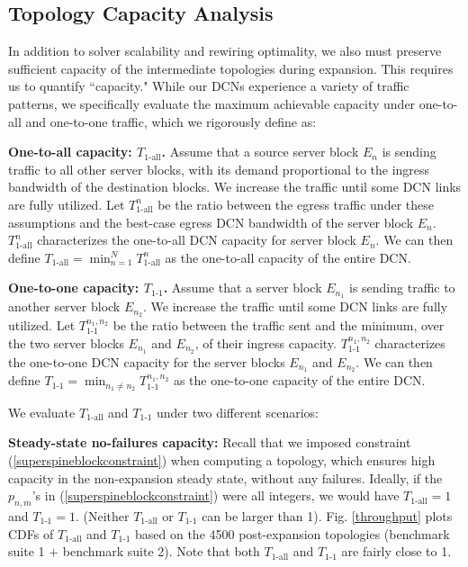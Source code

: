 \documentclass[letterpaper,twocolumn,10pt]{article}
\begin{document}
\subsection{Topology Capacity Analysis}\label{throughputanalysis}
In addition to solver scalability and rewiring optimality, we also must preserve sufficient capacity of the intermediate topologies during expansion.   This requires us to quantify ``capacity." While our DCNs experience a variety of traffic patterns, we specifically evaluate the maximum achievable capacity under one-to-all and one-to-one traffic, which we rigorously define as:

{\bf One-to-all capacity: $T_{\text{1-all}}$.} Assume that a source server block $E_n$ is sending traffic to all other server blocks, with its demand proportional to the ingress bandwidth of the destination blocks. We increase the traffic until some DCN links are fully utilized. Let $T_{\text{1-all}}^n$ be the ratio between the egress traffic under these assumptions and the best-case egress DCN bandwidth of the server block $E_n$. $T_{\text{1-all}}^n$ characterizes the one-to-all DCN capacity for server block $E_n$. We can then define $T_{\text{1-all}} = \min_{n=1}^N T_{\text{1-all}}^n$ as the one-to-all capacity of the entire DCN.

{\bf One-to-one capacity: $T_{\text{1-1}}$.} Assume that a server block $E_{n_1}$ is sending traffic to another server block $E_{n_2}$. We increase the traffic until some DCN links are fully utilized. Let $T_{\text{1-1}}^{n_1,n_2}$ be the ratio between the traffic sent and the minimum, over the two server blocks $E_{n_1}$ and $E_{n_2}$, of their ingress capacity. $T_{\text{1-1}}^{n_1,n_2}$ characterizes the one-to-one DCN capacity for the server blocks $E_{n_1}$ and $E_{n_2}$. We can then define $T_{\text{1-1}}=\min_{n_1\neq n_2} T_{\text{1-1}}^{n_1,n_2}$ as the one-to-one capacity of the entire DCN.

We evaluate $T_{\text{1-all}}$ and $T_{\text{1-1}}$ under two different scenarios:

{\bf Steady-state no-failures capacity:}
Recall that we imposed constraint (\ref{superspineblockconstraint}) when computing a topology, which ensures high capacity in the non-expansion steady state, without any failures. Ideally, if the $p_{n,m}$'s in (\ref{superspineblockconstraint}) were all integers, we would have $T_{\text{1-all}}=1$ and $T_{\text{1-1}}=1$. (Neither $T_{\text{1-all}}$ or $T_{\text{1-1}}$ can be larger than 1). Fig. \ref{throughput} plots CDFs of $T_{\text{1-all}}$ and $T_{\text{1-1}}$ based on the 4500 post-expansion topologies (benchmark suite 1 $+$ benchmark suite 2).  Note that both $T_{\text{1-all}}$ and $T_{\text{1-1}}$ are fairly close to 1.
\end{document}
